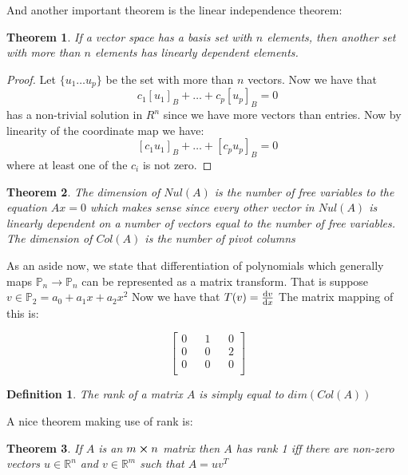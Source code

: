 \documentclass[titlepage]{article}
\newtheorem{thm}{Theorem}[subsection]
\newtheorem{definition}{Definition}[subsection]
\numberwithin{equation}{subsection}
\newcommand{\Rn}{\mathbb{R}^n}
\newcommand{\Rm}{\mathbb{R}^m}
\begin{document}
And another important theorem is the linear independence theorem:

\begin{thm}
If a vector space has a basis set with $n$ elements, then another set with more than $n$ elements has linearly dependent elements. 
\end{thm}

\begin{proof}
Let $\{u_{1} \ldots u_{p}\}$ be the set with more than $n$ vectors. Now we have that      
$$ c_{1}[u_{1}]_{B} + \ldots + c_{p}[u_{p}]_{B} = 0$$ has a non-trivial solution in $R^{n}$ since we have more vectors than entries. Now by linearity of the coordinate map we have:
$$ [c_{1}u_{1}]_{B} + \ldots + [c_{p}u_{p}]_{B} = 0$$ where at least one of the $c_{i}$ is not zero. 
\end{proof}


\begin{thm}
The dimension of $Nul(A)$ is the number of free variables to the equation $Ax=0$ which makes sense since every other vector in $Nul(A)$ is linearly dependent on a number of vectors equal to the number of free variables. The dimension of $Col(A)$ is the number of pivot columns 
\end{thm}

As an aside now, we state that differentiation of polynomials which generally maps $\mathbb{P}_{n} \to \mathbb{P}_{n}$ can be represented as a matrix transform. That is suppose $v \in \mathbb{P}_{2} = a_{0} + a_{1}x + a_{2}x^2$ Now we have that $T(v) = \dv{v}{x}$ The matrix mapping of this is:

$$ \begin{bmatrix}
0 && 1 && 0\\
0 && 0 && 2\\
0 && 0 && 0\\
\end{bmatrix}$$

\begin{definition}
The rank of a matrix $A$ is simply equal to $dim(Col(A))$
\end{definition}

A nice theorem making use of rank is:

\begin{thm}
If $A$ is an $m \cross n$ matrix then $A$ has rank 1 iff there are non-zero vectors $u \in \Rn$ and $v \in \Rm$ such that $A = uv^{T}$
\end{thm}
\end{document}
